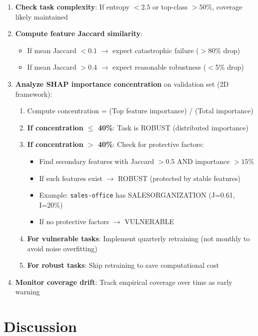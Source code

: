 \documentclass[sigconf]{acmart}
\begin{document}
\begin{enumerate}
    \item \textbf{Check task complexity}: If entropy $< 2.5$ or top-class $> 50\%$, coverage likely maintained
    \item \textbf{Compute feature Jaccard similarity}:
    \begin{itemize}
        \item If mean Jaccard $< 0.1$ $\rightarrow$ expect catastrophic failure ($>$80\% drop)
        \item If mean Jaccard $> 0.4$ $\rightarrow$ expect reasonable robustness ($<$5\% drop)
    \end{itemize}
    \item \textbf{Analyze SHAP importance concentration} on validation set (2D framework):
    \begin{enumerate}
        \item Compute concentration = (Top feature importance) / (Total importance)
        \item \textbf{If concentration $\leq$ 40\%}: Task is ROBUST (distributed importance)
        \item \textbf{If concentration $>$ 40\%}: Check for protective factors:
        \begin{itemize}
            \item Find secondary features with Jaccard $> 0.5$ AND importance $> 15\%$
            \item If such features exist $\rightarrow$ ROBUST (protected by stable features)
            \item Example: \texttt{sales-office} has SALESORGANIZATION (J=0.61, I=20\%)
            \item If no protective factors $\rightarrow$ VULNERABLE
        \end{itemize}
        \item \textbf{For vulnerable tasks}: Implement quarterly retraining (not monthly to avoid noise overfitting)
        \item \textbf{For robust tasks}: Skip retraining to save computational cost
    \end{enumerate}
    \item \textbf{Monitor coverage drift}: Track empirical coverage over time as early warning
\end{enumerate}

\section{Discussion}
\end{document}
